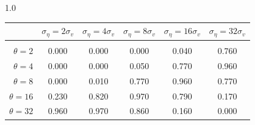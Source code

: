 \documentclass[12pt]{article}
\begin{document}
\begin{table}[h!]
\vspace{10pt}
\begin{subtable}{1.0\textwidth}
    \centering
\begin{tabular}{rccccc}
\hline  
            & \multicolumn{1}{l}{$\sigma_{\eta} =2\sigma_{v}$} & \multicolumn{1}{l}{$\sigma_{\eta} =4\sigma_{v}$} & \multicolumn{1}{l}{$\sigma_{\eta} =8\sigma_{v}$} & \multicolumn{1}{l}{$\sigma_{\eta} =16\sigma_{v}$} & \multicolumn{1}{l}{$\sigma_{\eta} =32\sigma_{v}$} \\ \hline  \vspace{-3mm} \\        
$\theta=2$  & 0.000                                             & 0.000                                             & 0.000                                             & 0.040                                              & 0.760                                              \\ \hline
$\theta=4$  & 0.000                                             & 0.000                                             & 0.050                                             & 0.770                                              & 0.960                                              \\ \hline
$\theta=8$  & 0.000                                             & 0.010                                             & 0.770                                             & 0.960                                              & 0.770                                              \\ \hline
$\theta=16$ & 0.230                                             & 0.820                                             & 0.970                                             & 0.790                                              & 0.170                                              \\ \hline
$\theta=32$ & 0.960                                             & 0.970                                             & 0.860                                             & 0.160                                              & 0.000                                              \\ \hline
\end{tabular}
\end{subtable}


\end{table}
\end{document}
